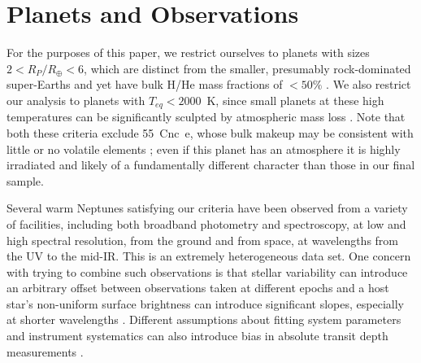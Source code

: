\documentclass[twocolumn]{aastex61}
\begin{document}

 
 



\section{Planets and Observations}
\label{sec:obs}

For the purposes of this paper, we restrict ourselves to planets with sizes $2 < R_P/R_\oplus < 6$, which are distinct from the smaller, presumably rock-dominated super-Earths \citep{fulton:2017} and yet have bulk H/He mass fractions of $<50\%$ \citep{lopez:2014}.  We also restrict our analysis to planets with $T_{eq} < 2000$~K, since small planets at these high temperatures can be significantly sculpted by atmospheric mass loss \citep{owen:2013}.   Note that both these criteria exclude 55~Cnc~e, whose bulk makeup may be consistent with little or no volatile elements \citep{demory:2016}; even if this planet has an atmosphere \citep{ridden-harper:2016,tsiaras:2016} it is highly irradiated and likely of a fundamentally different character than those in our final sample. 

Several warm Neptunes satisfying our criteria have been observed from a variety of facilities, including both broadband photometry and spectroscopy, at low and high spectral resolution, from the ground and from space, at wavelengths from the UV to the mid-IR. This is an extremely heterogeneous data set.  One concern with trying to combine such observations is that  stellar variability can introduce an arbitrary offset between observations taken at different epochs \citep[e.g.,][]{knutson:2011,fraine:2014} and a host star's non-uniform surface brightness can introduce significant slopes, especially at shorter wavelengths \citep{mccullough:2014,oshagh:2014}.  Different assumptions about fitting system parameters and instrument systematics can also introduce bias in absolute transit depth measurements \citep{stevenson:2014b}.
\end{document}
